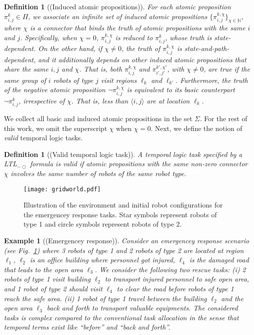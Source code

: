 \documentclass[Afour,sageh,times]{sagej}
\newtheorem{exmp}{Example}
\newtheorem{defn}[thm]{Definition}
\newcommand{\ltl}{ {\it LTL}$_{-\bigcirc}$ }
\newcommand{\ag}[2]{\langle#1,#2\rangle}
\renewcommand{\ap}[3]{\mathcal{\pi}_{{#1},{#2}}^{#3}}
\begin{document}
\begin{defn}[(Induced atomic propositions)]
   For each atomic proposition $\ap{i}{j}{k} \in \Pi$, we associate an infinite set of  {induced} atomic propositions $\{\ap{i}{j}{k,\chi}\}_{\chi\in \mathbb{N}}$, where $\chi$ is a {\it connector} that binds the truth of  atomic propositions with the same $i$ and $j$. Specifically, when $\chi=0$, $\ap{i}{j}{k,\chi}$ is reduced to $\ap{i}{j}{k}$, whose truth is state-dependent. On the other hand, if $\chi \neq 0$, the truth of $\ap{i}{j}{k,\chi}$ is state-and-path-dependent, and it additionally depends on other induced atomic propositions that share the same $i,j$ and $\chi$. That is, both $\ap{i}{j}{k,\chi}$ and $\ap{i'}{j'}{k',\chi'}$, with $\chi\not=0$, are true if the same group of $i$ robots of type $j$ visit regions $\ell_k$ and $\ell_{k'}$. Furthermore, the truth of the negative atomic proposition  $\neg \ap{i}{j}{k,\chi}$ is equivalent to its basic counterpart $\neg \ap{i}{j}{k}$, irrespective of  $\chi$. That is, less than $\ag{i}{j}$ are at location $\ell_k$.
 \end{defn}

We collect all basic and induced atomic propositions in the set $\Sigma$.  For the rest of this work, we omit the superscript $\chi$ when $\chi=0$. Next, we define the notion of {\it valid} temporal logic tasks.
 \begin{defn}[(Valid temporal logic task)]
A temporal logic task specified by a\ltl formula is valid if atomic propositions with the same non-zero connector $\chi$ involves the same number of robots of the same robot type.
 \end{defn}

 \begin{figure}[!t]
    \centering
    \texttt{[image: gridworld.pdf]}
    \caption{Illustration of the environment and initial robot configurations for the emergencey response tasks. Star symbols represent robots of type 1 and circle symbols represent robots of type 2.}\label{fig:workspace}
\end{figure}
\begin{exmp}[(Emergencey response)]\label{exmp:1}
  Consider an emergencey response scenario (see Fig.~\ref{fig:workspace}) where 3 robots of type 1 and 2 robots of type 2 are located at region $\ell_1$, $\ell_2$ is an office building where personnel got injured, $\ell_4$ is the damaged road that leads to the open area $\ell_3$. We consider the following two rescue tasks: {\it (i)} \label{task:i} 2 robots of type 1 visit building $\ell_2$ to transport injured personnel to safe open area, and 1 robot of type 2 should visit $\ell_4$ to clear the road before robots of type 1 reach the safe area. {\it (ii)} \label{task:ii} 1 robot of type 1 travel between the building $\ell_2$ and the open area $\ell_3$ back and forth to transport valuable equipments. The considered tasks is complex compared to the conventional task allocation  in the sense that temporal terms exist like ``before'' and ``back and forth''.
\end{exmp}
\end{document}
